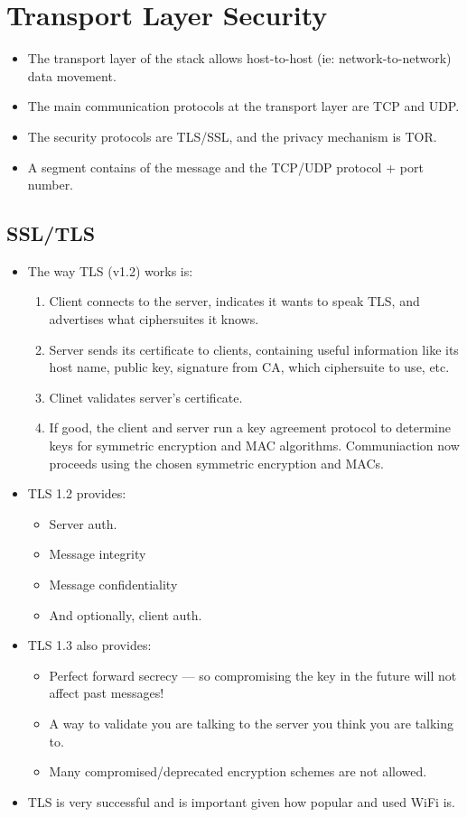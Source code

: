 \documentclass{article}
\begin{document}
\section{Transport Layer Security}
\begin{itemize}
    \item The transport layer of the stack allows host-to-host (ie: network-to-network) data movement.
    \item The main communication protocols at the transport layer are TCP and UDP.
    \item The security protocols are TLS/SSL, and the privacy mechanism is TOR.
    \item A segment contains of the message and the TCP/UDP protocol + port number.
\end{itemize}

\subsection{SSL/TLS}
\begin{itemize}
    \item The way TLS (v1.2) works is:
        \begin{enumerate}
            \item Client connects to the server, indicates it wants to speak TLS, and advertises what ciphersuites it knows.
            \item Server sends its certificate to clients, containing useful information like its host name, public key, signature from CA, which ciphersuite to use, etc.
            \item Clinet validates server's certificate.
            \item If good, the client and server run a key agreement protocol to determine keys for symmetric encryption and MAC algorithms.  Communiaction now proceeds using the chosen symmetric encryption and MACs.
        \end{enumerate}
    \item TLS 1.2 provides:
        \begin{itemize}
            \item Server auth.
            \item Message integrity
            \item Message confidentiality
            \item And optionally, client auth.
        \end{itemize}
    \item TLS 1.3 also provides:
        \begin{itemize}
            \item Perfect forward secrecy --- so compromising the key in the future will not affect past messages!
            \item A way to validate you are talking to the server you think you are talking to.
            \item Many compromised/deprecated encryption schemes are not allowed.
        \end{itemize}
    \item TLS is very successful and is important given how popular and used WiFi is.
\end{itemize}
\end{document}
